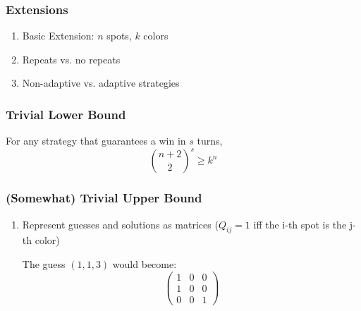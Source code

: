 \documentclass{beamer}
\begin{document}
    \begin{frame}
    	\frametitle{Extensions}
		\begin{enumerate}[label=\roman*.]
		\item Basic Extension: $n$ spots, $k$ colors
		\item Repeats vs. no repeats
		\item Non-adaptive vs. adaptive strategies
		\end{enumerate}
    \end{frame}
    
    \begin{frame}
    \frametitle{Trivial Lower Bound}
    \begin{enumerate}[label=\arabic*.]
    \end{enumerate}
	\begin{tcolorbox}[colback=blue!5,colframe=blue!40!black,title=Theorem]
	For any strategy that guarantees a win in $s$ turns, \\
	\begin{equation*}
	\binom{n+2}{2}^s \geq k^n
	\end{equation*}
	\end{tcolorbox}

    \end{frame}

    \begin{frame}
    \frametitle{(Somewhat) Trivial Upper Bound}
    \begin{enumerate}[label=\arabic*.]
	\item Represent guesses and solutions as matrices ($Q_{ij} = 1$ iff the i-th spot is the j-th color) \\
	\begin{tcolorbox}[colback=blue!5,colframe=blue!40!black,title=Example]
	The guess $(1,1,3)$ would become:
	\[ \left( \begin{array}{ccc}
	1 & 0 & 0 \\
	1 & 0 & 0 \\
	0 & 0 & 1 \end{array} \right)\]
	\end{tcolorbox}
	 \vspace{10px}
    \end{enumerate}
    \end{frame}
\end{document}
